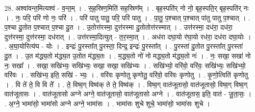 \documentclass[17pt]{extarticle}
\begin{document}
28. अश्वा॑वन्त॒मित्यश्व॑ - व॒न्त॒म् । . स॒ह॒स्रिण॒मिति॑ सह॒स्रिण᳚म् । . बृह॒स्पति॑र् नो नो॒ बृह॒स्पति॒र् बृह॒स्पति॑र् नः । . नः॒ परि॒ परि॑ णो नः॒ परि॑ । . परि॑ पातु पातु॒ परि॒ परि॑ पातु । . पा॒तु॒ प॒श्चात् प॒श्चात् पा॑तु पातु प॒श्चात् । . प॒श्चा दु॒तोत प॒श्चात् प॒श्चा दु॒त । . उ॒तोत्त॑रस्मा॒ दुत्त॑रस्मा दु॒तोतोत्त॑रस्मात् । . उत्त॑रस्मा॒ दध॑रा॒ दध॑रा॒ दुत्त॑रस्मा॒ दुत्त॑रस्मा॒ दध॑रात् । . उत्त॑रस्मा॒दित्युत् - त॒र॒स्मा॒त् । . अध॑रा दघा॒यो र॑घा॒यो रध॑रा॒ दध॑रा दघा॒योः । . अ॒घा॒योरित्य॑घ - योः । . इन्द्रः॑ पु॒रस्ता᳚त् पु॒रस्ता॒ दिन्द्र॒ इन्द्रः॑ पु॒रस्ता᳚त् । . पु॒रस्ता॑ दु॒तोत पु॒रस्ता᳚त् पु॒रस्ता॑ दु॒त । . उ॒त म॑द्ध्य॒तो म॑द्ध्य॒त उ॒तोत म॑द्ध्य॒तः । . म॒द्ध्य॒तो नो॑ नो मद्ध्य॒तो म॑द्ध्य॒तो नः॑ । . नः॒ सखा॒ सखा॑ नो नः॒ सखा᳚ । . सखा॒ सखि॑भ्यः॒ सखि॑भ्यः॒ सखा॒ सखा॒ सखि॑भ्यः । . सखि॑भ्यो॒ वरि॑वो॒ वरि॑वः॒ सखि॑भ्यः॒ सखि॑भ्यो॒ वरि॑वः । . सखि॑भ्य॒ इति॒ सखि॑ - भ्यः॒ । . वरि॑वः कृणोतु कृणोतु॒ वरि॑वो॒ वरि॑वः कृणोतु । . कृ॒णो॒त्विति॑ कृणोतु । . वि ते॑ ते॒ वि वि ते᳚ । . ते॒ विष्व॒ग् विष्व॑क् ते ते॒ विष्व॑क् । . विष्व॒ग् वात॑जूतासो॒ वात॑जूतासो॒ विष्व॒ग् विष्व॒ग् वात॑जूतासः । . वात॑जूतासो अग्ने अग्ने॒ वात॑जूतासो॒ वात॑जूतासो अग्ने । . वात॑जूतास॒ इति॒ वात॑ - जू॒ता॒सः॒ । . अ॒ग्ने॒ भामा॑सो॒ भामा॑सो अग्ने अग्ने॒ भामा॑सः । . भामा॑सः शुचे शुचे॒ भामा॑सो॒ भामा॑सः शुचे । \newline
\end{document}
